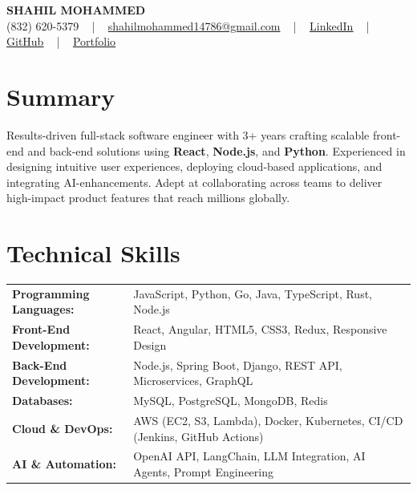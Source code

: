\documentclass[letterpaper,11pt]{article}
\begin{document}
\begin{center}
    {\fontsize{14pt}{12pt}\selectfont \textbf{\MakeUppercase{Shahil Mohammed}}}\\ \vspace{2pt}
    \fontsize{10pt}{12pt}\selectfont (832) 620-5379 ~ | ~ \href{mailto:shahilmohammed14786@gmail.com}{shahilmohammed14786@gmail.com} ~ | ~  
    \href{https://www.linkedin.com/in/shahil-mohammed-9652931a1/}{\color{blue}\underline{LinkedIn}}  ~ | ~ 
    \href{https://github.com/freakbeast14}{\color{blue}\underline{GitHub}} ~ | ~ 
    \href{https://shahil-mohammed.netlify.app/}{\color{blue}\underline{Portfolio}}
    \vspace{-8pt}
\end{center}

\section{Summary}
\fontsize{9pt}{10pt}\selectfont
Results-driven full-stack software engineer with 3+ years crafting scalable front-end and back-end solutions using \textbf{React}, \textbf{Node.js}, and \textbf{Python}. Experienced in designing intuitive user experiences, deploying cloud-based applications, and integrating AI-enhancements. Adept at collaborating across teams to deliver high-impact product features that reach millions globally.
 \vspace{-5pt}
 
\section{Technical Skills}
        \vspace{-14pt}
        \begin{table}[h]
            \fontsize{9pt}{10pt}\selectfont
            \begin{tabular}{p{0.3\linewidth} p{0.7\linewidth}}
                \textbf{Programming Languages:} & JavaScript, Python, Go, Java, TypeScript, Rust, Node.js \\
                \textbf{Front-End Development:} & React, Angular, HTML5, CSS3, Redux, Responsive Design \\
                \textbf{Back-End Development:} & Node.js, Spring Boot, Django, REST API, Microservices, GraphQL \\
                \textbf{Databases:} & MySQL, PostgreSQL, MongoDB, Redis \\
                \textbf{Cloud \& DevOps:} & AWS (EC2, S3, Lambda), Docker, Kubernetes, CI/CD (Jenkins, GitHub Actions) \\
                \textbf{AI \& Automation:} & OpenAI API, LangChain, LLM Integration, AI Agents, Prompt Engineering \\
            \end{tabular}
        \end{table}
 \vspace{-15pt}
 
\end{document}
